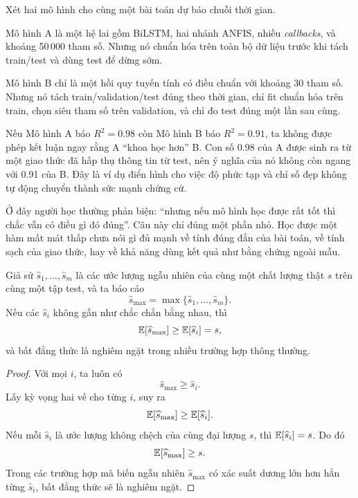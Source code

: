 \begin{example}
Xét hai mô hình cho cùng một bài toán dự báo chuỗi thời gian.

Mô hình A là một hệ lai gồm BiLSTM, hai nhánh ANFIS, nhiều \emph{callbacks}, và khoảng 50\,000 tham số. Nhưng nó chuẩn hóa trên toàn bộ dữ liệu trước khi tách train/test và dùng test để dừng sớm.

Mô hình B chỉ là một hồi quy tuyến tính có điều chuẩn với khoảng 30 tham số. Nhưng nó tách train/validation/test đúng theo thời gian, chỉ fit chuẩn hóa trên train, chọn siêu tham số trên validation, và chỉ đo test đúng một lần sau cùng.

Nếu Mô hình A báo \(R^2=0.98\) còn Mô hình B báo \(R^2=0.91\), ta không được phép kết luận ngay rằng A ``khoa học hơn'' B. Con số 0.98 của A được sinh ra từ một giao thức đã hấp thụ thông tin từ test, nên ý nghĩa của nó không còn ngang với 0.91 của B. Đây là ví dụ điển hình cho việc độ phức tạp và chỉ số đẹp không tự động chuyển thành sức mạnh chứng cứ.
\end{example}

Ở đây người học thường phản biện: ``nhưng nếu mô hình học được rất tốt thì chắc vẫn có điều gì đó đúng''. Câu này chỉ đúng một phần nhỏ. Học được một hàm mất mát thấp chưa nói gì đủ mạnh về tính đúng đắn của bài toán, về tính sạch của giao thức, hay về khả năng dùng kết quả như bằng chứng ngoài mẫu.

\begin{proposition}
Giả sử \(\widehat s_1,\dots,\widehat s_m\) là các ước lượng ngẫu nhiên của cùng một chất lượng thật \(s\) trên cùng một tập test, và ta báo cáo
\[
\widehat s_{\max}=\max\{\widehat s_1,\dots,\widehat s_m\}.
\]
Nếu các \(\widehat s_i\) không gần như chắc chắn bằng nhau, thì
\[
\mathbb{E}[\widehat s_{\max}] \ge \mathbb{E}[\widehat s_i] = s,
\]
và bất đẳng thức là nghiêm ngặt trong nhiều trường hợp thông thường.
\end{proposition}

\begin{proof}
Với mọi \(i\), ta luôn có
\[
\widehat s_{\max} \ge \widehat s_i.
\]
Lấy kỳ vọng hai vế cho từng \(i\), suy ra
\[
\mathbb{E}[\widehat s_{\max}] \ge \mathbb{E}[\widehat s_i].
\]
Nếu mỗi \(\widehat s_i\) là ước lượng không chệch của cùng đại lượng \(s\), thì \(\mathbb{E}[\widehat s_i]=s\). Do đó
\[
\mathbb{E}[\widehat s_{\max}] \ge s.
\]
Trong các trường hợp mà biến ngẫu nhiên \(\widehat s_{\max}\) có xác suất dương lớn hơn hẳn từng \(\widehat s_i\), bất đẳng thức sẽ là nghiêm ngặt.
\end{proof}

